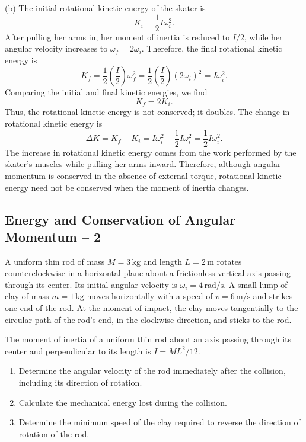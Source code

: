 \documentclass[12pt]{article}
\begin{document}
(b) The initial rotational kinetic energy of the skater is
\begin{equation}
    K_i=\frac{1}{2}I\omega_i^2.
\end{equation}
After pulling her arms in, her moment of inertia is reduced to $I/2$, while her angular velocity increases to $\omega_f=2\omega_i$. Therefore, the final rotational kinetic energy is
\begin{equation}
    K_f=\frac{1}{2}\left(\frac{I}{2}\right)\omega_f^2
    =\frac{1}{2}\left(\frac{I}{2}\right)(2\omega_i)^2
    =I\omega_i^2.
\end{equation}
Comparing the initial and final kinetic energies, we find
\begin{equation}
    \boxed{K_f=2K_i}.
\end{equation}
Thus, the rotational kinetic energy is not conserved; it doubles. The change in rotational kinetic energy is
\begin{equation}
    \Delta K=K_f-K_i
    =I\omega_i^2-\frac{1}{2}I\omega_i^2
    =\boxed{\frac{1}{2}I\omega_i^2}.
\end{equation}
The increase in rotational kinetic energy comes from the work performed by the skater's muscles while pulling her arms inward. Therefore, although angular momentum is conserved in the absence of external torque, rotational kinetic energy need not be conserved when the moment of inertia changes.

\subsection{Energy and Conservation of Angular Momentum -- 2}

A uniform thin rod of mass $M=3\,\mathrm{kg}$ and length
$L=2\,\mathrm{m}$ rotates counterclockwise in a horizontal
plane about a frictionless vertical axis passing through
its center. Its initial angular velocity is
$\omega_i=4\,\mathrm{rad/s}$. A small lump of clay of mass
$m=1\,\mathrm{kg}$ moves horizontally with a speed of
$v=6\,\mathrm{m/s}$ and strikes one end of the rod.
At the moment of impact, the clay moves tangentially
to the circular path of the rod's end, in the clockwise
direction, and sticks to the rod.

The moment of inertia of a uniform thin rod about an
axis passing through its center and perpendicular to
its length is $I=ML^2/12$.

\begin{enumerate}
    \item[(a)] Determine the angular velocity of the
    rod immediately after the collision, including
    its direction of rotation.
    \item[(b)] Calculate the mechanical energy lost
    during the collision.
    \item[(c)] Determine the minimum speed of the clay
    required to reverse the direction of rotation
    of the rod.
\end{enumerate}
\end{document}
